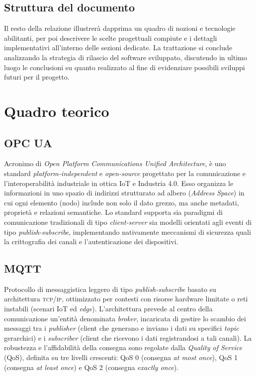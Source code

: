 \documentclass[12pt]{article}
\begin{document}
    \subsection{Struttura del documento}
    Il resto della relazione illustrerà dapprima un quadro di nozioni e tecnologie abilitanti, per poi descrivere le scelte progettuali compiute e i dettagli implementativi all'interno delle sezioni dedicate. La trattazione si conclude analizzando la strategia di rilascio del software sviluppato, discutendo in ultimo luogo le conclusioni su quanto realizzato al fine di evidenziare possibili sviluppi futuri per il progetto.

    \section{Quadro teorico}

    \subsection{OPC UA}
    
    Acronimo di \textit{Open Platform Communications Unified Architecture}, è uno standard \textit{platform-independent} e \textit{open-source} progettato per la comunicazione e l'interoperabilità industriale in ottica IoT e Industria 4.0. 
    Esso organizza le informazioni in uno spazio di indirizzi strutturato ad albero (\textit{Address Space}) in cui ogni elemento (nodo) include non solo il dato grezzo, ma anche metadati, proprietà e relazioni semantiche. 
    Lo standard supporta sia paradigmi di comunicazione tradizionali di tipo \textit{client-server} sia modelli orientati agli eventi di tipo \textit{publish-subscribe}, implementando nativamente meccanismi di sicurezza quali la crittografia dei canali e l'autenticazione dei dispositivi.
    
    \subsection{MQTT}
    
    Protocollo di messaggistica leggero di tipo \textit{publish-subscribe} basato su architettura \textsc{tcp/ip}, ottimizzato per contesti con risorse hardware limitate o reti instabili (scenari IoT ed \textit{edge}). 
    L'architettura prevede al centro della comunicazione un'entità denominata \textit{broker}, incaricata di gestire lo scambio dei messaggi tra i \textit{publisher} (client che generano e inviano i dati su specifici \textit{topic} gerarchici) e i \textit{subscriber} (client che ricevono i dati registrandosi a tali canali). 
    La robustezza e l'affidabilità della consegna sono regolate dalla \textit{Quality of Service} (QoS), definita su tre livelli crescenti: QoS 0 (consegna \textit{at most once}), QoS 1 (consegna \textit{at least once}) e QoS 2 (consegna \textit{exactly once}).
    
\end{document}
